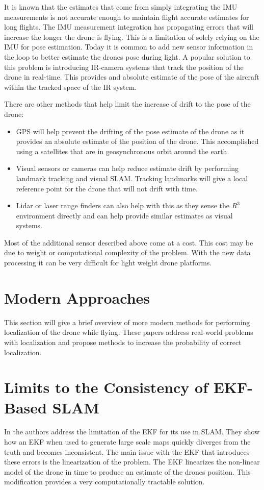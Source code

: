 \documentclass[conference]{IEEEtran}
\begin{document}
It is known that the estimates that come from simply integrating the IMU measurements is not accurate enough to maintain flight accurate estimates for long flights. The IMU measurement integration has propagating errors that will increase the longer the drone is flying. This is a limitation of solely relying on the IMU for pose estimation. Today it is common to add new sensor information in the loop to better estimate the drones pose during light. A popular solution to this problem is introducing IR-camera systems that track the position of the drone in real-time. This provides and absolute estimate of the pose of the aircraft within the tracked space of the IR system.

There are other methods that help limit the increase of drift to the pose of the drone:
\begin{itemize}
\item GPS will help prevent the drifting of the pose estimate of the drone as it provides an absolute estimate of the position of the drone. This accomplished using a satellites that are in geosynchronous orbit around the earth.
\item Visual sensors or cameras can help reduce estimate drift by performing landmark tracking and visual SLAM. Tracking landmarks will give a local reference point for the drone that will not drift with time.
\item Lidar or laser range finders can also help with this as they sense the $R^3$ environment directly and can help provide similar estimates as visual systems.
\end{itemize}
Most of the additional sensor described above come at a cost. This cost may be due to weight or computational complexity of the problem. With the new data processing it can be very difficult for light weight drone platforms.

\section{Modern Approaches}
This section will give a brief overview of more modern methods for performing localization of the drone while flying. These papers address real-world problems with localization and propose methods to increase the probability of correct localization.

\section{Limits to the Consistency of EKF-Based SLAM}
In \cite{juanlimits} the authors address the limitation of the EKF for its use in SLAM. They show how an EKF when used to generate large scale maps quickly diverges from the truth and becomes inconsistent. The main issue with the EKF that introduces these errors is the linearization of the problem. The EKF linearizes the non-linear model of the drone in time to produce an estimate of the drones position. This modification provides a very computationally tractable solution.
\end{document}
